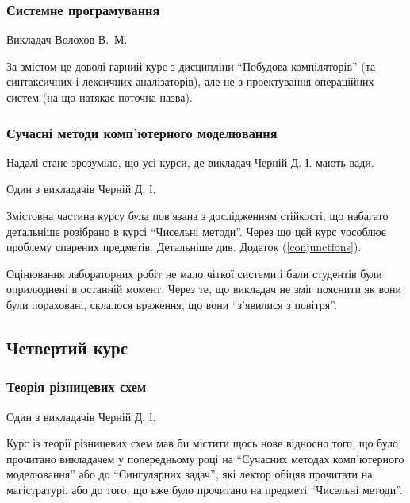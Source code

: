 \documentclass[14pt, a4paper]{extarticle}  %
\begin{document}



\subsubsection{Системне програмування}
Викладач Волохов В.~М. 

За змістом це доволі гарний курс з дисципліни ``Побудова компіляторів'' (та синтаксичних і лексичних аналізаторів), але не з проектування операційних систем (на що натякає поточна назва). 

\subsubsection{Сучасні методи комп'ютерного моделювання}
Надалі стане зрозуміло, що усі курси, де викладач Черній Д. І. мають вади.

Один з викладачів Черній Д. І.

Змістовна частина курсу була пов'язана з дослідженням стійкості, що набагато детальніше розібрано в курсі ``Чисельні методи''. Через що цей курс уособлює проблему спарених предметів. Детальніше див. Додаток (\ref{conjunctions}).

Оцінювання лабораторних робіт не мало чіткої системи і бали студентів були оприлюднені в останній момент. Через те, що  викладач не зміг пояснити як вони були пораховані, склалося враження, що вони ``з'явилися з повітря''. 

\subsection{Четвертий курс}
\subsubsection{Теорія різницевих схем} 
Один з викладачів Черній Д. І.

Курс із теорії різницевих схем мав би містити щось нове відносно того, що було прочитано викладачем у попередньому році на ``Сучасних методах комп'ютерного моделювання'' або до ``Сингулярних задач'', які лектор обіцяв прочитати на магістратурі, або до того, що вже було прочитано на предметі ``Чисельні методи''. 
\end{document}

